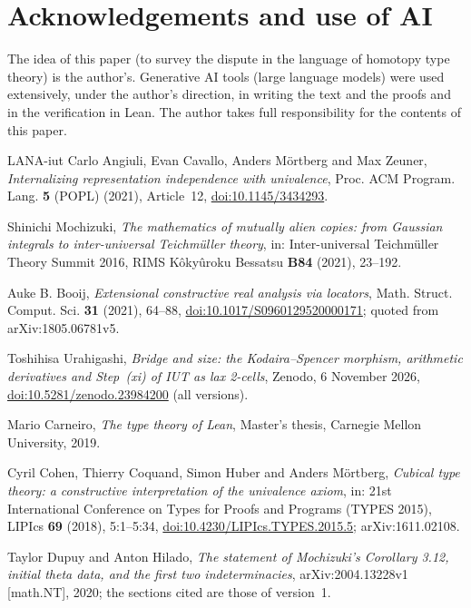\documentclass[11pt,a4paper]{article}
\theoremstyle{plain}
\theoremstyle{definition}
\theoremstyle{remark}
\begin{document}
\section*{Acknowledgements and use of AI}
The idea of this paper (to survey the dispute in the language of homotopy type theory) is the author's. Generative AI
tools (large language models) were used extensively, under the author's direction, in writing the text and the proofs
and in the verification in Lean. The author takes full responsibility for the contents of this paper.

\begin{thebibliography}{LANA-iut}
Carlo Angiuli, Evan Cavallo, Anders M\"ortberg and Max Zeuner, \emph{Internalizing representation independence with
univalence}, Proc. ACM Program. Lang. \textbf{5} (POPL) (2021), Article~12,
\href{https://doi.org/10.1145/3434293}{doi:10.1145/3434293}.

Shinichi Mochizuki, \emph{The mathematics of mutually alien copies: from {G}aussian integrals to inter-universal
{T}eichm\"uller theory}, in: Inter-universal Teichm\"uller Theory Summit 2016, RIMS K\^oky\^uroku Bessatsu \textbf{B84}
(2021), 23--192.

Auke B. Booij, \emph{Extensional constructive real analysis via locators}, Math. Struct. Comput. Sci. \textbf{31}
(2021), 64--88, \href{https://doi.org/10.1017/S0960129520000171}{doi:10.1017/S0960129520000171}; quoted from
arXiv:1805.06781v5.

Toshihisa Urahigashi, \emph{Bridge and size: the {K}odaira--{S}pencer morphism, arithmetic derivatives and {S}tep~(xi)
of {IUT} as lax 2-cells}, Zenodo, 6 November 2026,
\href{https://doi.org/10.5281/zenodo.23984200}{doi:10.5281/zenodo.23984200} (all versions).

Mario Carneiro, \emph{The type theory of {L}ean}, Master's thesis, Carnegie Mellon University, 2019.

Cyril Cohen, Thierry Coquand, Simon Huber and Anders M\"ortberg, \emph{Cubical type theory: a constructive interpretation
of the univalence axiom}, in: 21st International Conference on Types for Proofs and Programs (TYPES 2015),
LIPIcs \textbf{69} (2018), 5:1--5:34, \href{https://doi.org/10.4230/LIPIcs.TYPES.2015.5}{doi:10.4230/LIPIcs.TYPES.2015.5};
arXiv:1611.02108.

Taylor Dupuy and Anton Hilado, \emph{The statement of {M}ochizuki's {C}orollary 3.12, initial theta data, and the first
two indeterminacies}, arXiv:2004.13228v1 [math.NT], 2020; the sections cited are those of version~1.


\end{thebibliography}
\end{document}
